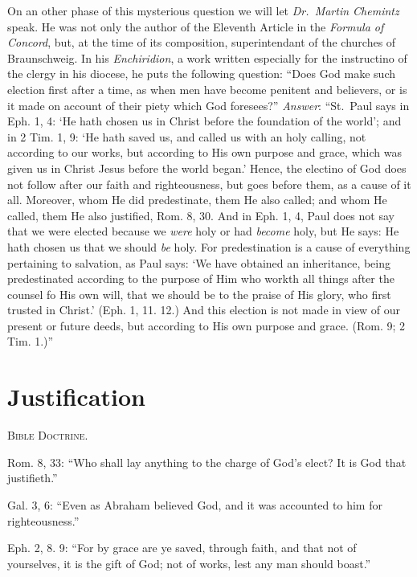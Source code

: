 \documentclass[
]{book}
\begin{document}
On an other phase of this mysterious question we will let \emph{Dr.~Martin Chemintz} speak. He was not only the author of the Eleventh Article in the \emph{Formula of Concord}, but, at the time of its composition, superintendant of the churches of Braunschweig. In his \emph{Enchiridion}, a work written especially for the instructino of the clergy in his diocese, he puts the following question: ``Does God make such election first after a time, as when men have become penitent and believers, or is it made on account of their piety which God foresees?'' \emph{Answer}: ``St.~Paul says in Eph. 1, 4: `He hath chosen us in Christ before the foundation of the world'; and in 2 Tim. 1, 9: `He hath saved us, and called us with an holy calling, not according to our works, but according to His own purpose and grace, which was given us in Christ Jesus before the world began.' Hence, the electino of God does not follow after our faith and righteousness, but goes before them, as a cause of it all. Moreover, whom He did predestinate, them He also called; and whom He called, them He also justified, Rom. 8, 30. And in Eph. 1, 4, Paul does not say that we were elected because we \emph{were} holy or had \emph{become} holy, but He says: He hath chosen us that we should \emph{be} holy. For predestination is a cause of everything pertaining to salvation, as Paul says: `We have obtained an inheritance, being predestinated according to the purpose of Him who workth all things after the counsel fo His own will, that we should be to the praise of His glory, who first trusted in Christ.' (Eph. 1, 11. 12.) And this election is not made in view of our present or future deeds, but according to His own purpose and grace. (Rom. 9; 2 Tim. 1.)''

\section{Justification}\label{justification}

\begin{center}
\textsc{Bible Doctrine.}
\end{center}

Rom. 8, 33: ``Who shall lay anything to the charge of God's elect? It is God that justifieth.''

Gal. 3, 6: ``Even as Abraham believed God, and it was accounted to him for righteousness.''

Eph. 2, 8. 9: ``For by grace are ye saved, through faith, and that not of yourselves, it is the gift of God; not of works, lest any man should boast.''
\end{document}
